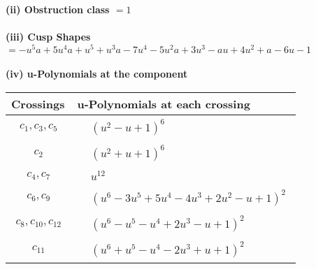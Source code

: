 \documentclass[1p]{elsarticle_modified}
\theoremstyle{definition}
\begin{document}
\flushleft \textbf{(ii) Obstruction class $= 1$}\\~\\
\flushleft \textbf{(iii) Cusp Shapes $= - u^5 a+5 u^4 a+u^5+u^3 a-7 u^4-5 u^2 a+3 u^3- a u+4 u^2+a-6 u-1$}\\~\\
\newpage\renewcommand{\arraystretch}{1}
\flushleft \textbf{(iv) u-Polynomials at the component}\newline \\
\begin{tabular}{m{50pt}|m{274pt}}
Crossings & \hspace{64pt}u-Polynomials at each crossing \\
\hline $$\begin{aligned}c_{1},c_{3},c_{5}\end{aligned}$$&$\begin{aligned}
&(u^2- u+1)^6
\end{aligned}$\\
\hline $$\begin{aligned}c_{2}\end{aligned}$$&$\begin{aligned}
&(u^2+u+1)^6
\end{aligned}$\\
\hline $$\begin{aligned}c_{4},c_{7}\end{aligned}$$&$\begin{aligned}
&u^{12}
\end{aligned}$\\
\hline $$\begin{aligned}c_{6},c_{9}\end{aligned}$$&$\begin{aligned}
&(u^6-3 u^5+5 u^4-4 u^3+2 u^2- u+1)^2
\end{aligned}$\\
\hline $$\begin{aligned}c_{8},c_{10},c_{12}\end{aligned}$$&$\begin{aligned}
&(u^6- u^5- u^4+2 u^3- u+1)^2
\end{aligned}$\\
\hline $$\begin{aligned}c_{11}\end{aligned}$$&$\begin{aligned}
&(u^6+u^5- u^4-2 u^3+u+1)^2
\end{aligned}$\\
\hline
\end{tabular}\\~\\
\end{document}
